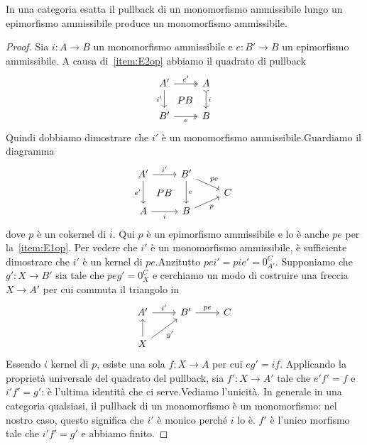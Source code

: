 \begin{proposition}\label{proposition:PbAdmMonicIsAdmMonic}
  In una categoria esatta il pullback di un monomorfismo ammissibile
  lungo un epimorfismo ammissibile produce un monomorfismo ammissibile.
\end{proposition}

\begin{proof}
  Sia \(i : A \to B\) un monomorfismo ammissibile e \(e : B ' \to B\) un
  epimorfismo ammissibile. A causa di~\ref{item:E2op} abbiamo il
  quadrato di pullback
  \[
    \begin{tikzcd}
      A' \ar["{i'}", d, swap] \ar["{PB}" description, dr, phantom]
      \ar["{e'}", twoheadrightarrow, r] & A \ar["{i}", rightarrowtail, d] \\
      B' \ar["{e}", twoheadrightarrow, r, swap] & B
    \end{tikzcd}
  \]
  Quindi dobbiamo dimostrare che \(i'\) è un monomorfismo
  ammissibile.\newline Guardiamo il diagramma
  \[
    \begin{tikzcd}[row sep=tiny]
      A' \ar[dd, "{e'}", swap] \ar[r, "{i'}"] \ar["{PB}" description,
      phantom,
      ddr] & B' \ar["{e}", dd] \ar["{pe}", dr] \\
      & & C \\
      A \arrow[r, "{i}", swap] & B \ar["{p}", ur, swap]
    \end{tikzcd}
  \]
  dove \(p\) è un cokernel di \(i\). Qui \(p\) è un epimorfismo
  ammissibile e lo è anche \(pe\) per la~\ref{item:E1op}. Per vedere che
  \(i'\) è un monomorfismo ammissibile, è sufficiente dimostrare che
  \(i'\) è un kernel di \(pe\).\newline Anzitutto
  \(pei' = pie' = 0_{A'}^C\). Supponiamo che \(g':X \to B'\) sia tale
  che \(peg' = 0_X^C\) e cerchiamo un modo di costruire una freccia
  \(X \to A'\) per cui commuta il triangolo in
  \[
    \begin{tikzcd}
      A' \ar["{i'}", r] & B' \ar["{pe}", r] & C \\
      X \ar["{}", u] \ar["{g'}", ur, swap]
    \end{tikzcd}
  \]
  Essendo \(i\) kernel di \(p\), esiste una sola \(f: X \to A\) per cui
  \(eg' = if\). Applicando la proprietà universale del quadrato del
  pullback, sia \(f': X \to A'\) tale che \(e'f' = f\) e \(i'f' = g'\):
  è l'ultima identità che ci serve.\newline Vediamo l'unicità. In
  generale in una categoria qualsiasi, il pullback di un monomorfismo è
  un monomorfismo: nel nostro caso, questo significa che \(i'\) è monico
  perché \(i\) lo è. \(f'\) è l'unico morfismo tale che \(i'f' = g'\) e
  abbiamo finito.
\end{proof}

